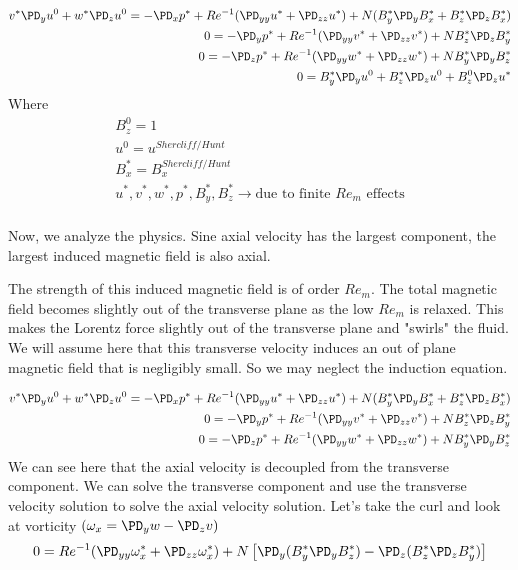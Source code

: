\documentclass[11pt]{article}
\begin{document}
\begin{equation}\begin{aligned}
v^* \PD_y u^0 + w^* \PD_z u^0 = -\PD_x p^* + Re^{-1} (\PD_{yy} u^* + \PD_{zz} u^*) + N (B_y^* \PD_y B_x^* + B_z^* \PD_z B_x^*) \\
0 = -\PD_y p^* + Re^{-1} (\PD_{yy} v^* + \PD_{zz} v^*) + N B_z^* \PD_z B_y^* \\
0 = -\PD_z p^* + Re^{-1} (\PD_{yy} w^* + \PD_{zz} w^*) + N B_y^* \PD_y B_z^* \\
0 =  B_y^{*} \PD_y u^0 + B_z^{*} \PD_z u^0 + B_z^0 \PD_z u^* \\
\end{aligned}\end{equation}
Where
\begin{equation}\begin{aligned}
B_z^0 = 1 \\
u^0 = u^{Shercliff /  Hunt} \\
B_x^* = B_x^{Shercliff /  Hunt} \\
u^*,v^*,w^*,p^*,B_y^*,B_z^* \rightarrow \text{due to finite $Re_m$ effects} \\
\end{aligned}\end{equation}



Now, we analyze the physics. Sine axial velocity has the largest component, the largest induced magnetic field is also axial.

The strength of this induced magnetic field is of order $Re_m$. The total magnetic field becomes slightly out of 
the transverse plane as the low $Re_m$ is relaxed. This makes the Lorentz force slightly out of the transverse plane
and "swirls" the fluid. We will assume here that this transverse velocity induces an out of plane magnetic field that 
is negligibly small. So we may neglect the induction equation. 

\begin{equation}\begin{aligned}
v^* \PD_y u^0 + w^* \PD_z u^0 = -\PD_x p^* + Re^{-1} (\PD_{yy} u^* + \PD_{zz} u^*) + N (B_y^* \PD_y B_x^* + B_z^* \PD_z B_x^*) \\
0 = -\PD_y p^* + Re^{-1} (\PD_{yy} v^* + \PD_{zz} v^*) + N B_z^* \PD_z B_y^* \\
0 = -\PD_z p^* + Re^{-1} (\PD_{yy} w^* + \PD_{zz} w^*) + N B_y^* \PD_y B_z^* \\
\end{aligned}\end{equation}
We can see here that the axial velocity is decoupled from the transverse component. We can solve the transverse component
and use the transverse velocity solution to solve the axial velocity solution. 
Let's take the curl and look at vorticity $(\omega_x = \PD_y w - \PD_z v)$
\begin{equation}\begin{aligned}
0 = Re^{-1} (\PD_{yy} \omega_x^* + \PD_{zz} \omega_x^*) 
+ N \left[ \PD_y (B_y^* \PD_y B_z^*) 
- \PD_z (B_z^* \PD_z B_y^*) \right] \\
\end{aligned}\end{equation}
\end{document}
